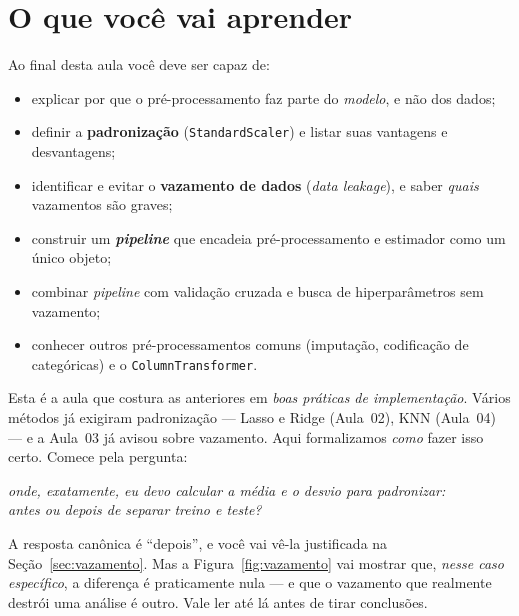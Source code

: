 \documentclass[11pt,a4paper]{article}
\title{}
\date{}
\begin{document}

\section*{O que você vai aprender}
Ao final desta aula você deve ser capaz de:
\begin{itemize}[leftmargin=1.4cm]
  \item explicar por que o pré-processamento faz parte do \emph{modelo}, e não dos
        dados;
  \item definir a \textbf{padronização} (\texttt{StandardScaler}) e listar suas
        vantagens e desvantagens;
  \item identificar e evitar o \textbf{vazamento de dados} (\emph{data leakage}),
        e saber \emph{quais} vazamentos são graves;
  \item construir um \textbf{\emph{pipeline}} que encadeia pré-processamento e
        estimador como um único objeto;
  \item combinar \emph{pipeline} com validação cruzada e busca de hiperparâmetros
        sem vazamento;
  \item conhecer outros pré-processamentos comuns (imputação, codificação de
        categóricas) e o \texttt{ColumnTransformer}.
\end{itemize}

\noindent
Esta é a aula que costura as anteriores em \emph{boas práticas de implementação}.
Vários métodos já exigiram padronização --- Lasso e Ridge (Aula~02), KNN
(Aula~04) --- e a Aula~03 já avisou sobre vazamento. Aqui formalizamos \emph{como}
fazer isso certo. Comece pela pergunta:

\begin{center}\itshape
  onde, exatamente, eu devo calcular a média e o desvio para padronizar:\\
  antes ou depois de separar treino e teste?
\end{center}

\noindent
A resposta canônica é ``depois'', e você vai vê-la justificada na
Seção~\ref{sec:vazamento}. Mas a Figura~\ref{fig:vazamento} vai mostrar que,
\emph{nesse caso específico}, a diferença é praticamente nula --- e que o vazamento
que realmente destrói uma análise é outro. Vale ler até lá antes de tirar conclusões.
\end{document}
